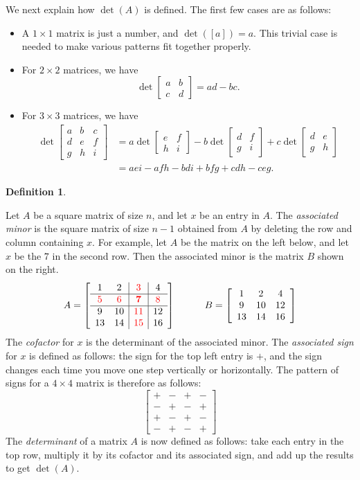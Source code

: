 \documentclass[a4paper]{book}
\newcommand{\RED}[1]{{\color{red}#1}}
\newcommand{\PURPLE}[1]{{\color{purple}#1}}
\newcommand{\bbm}       {\begin{bmatrix}}
\newcommand{\ebm}       {\end{bmatrix}}
\newcommand{\tm}        {\times}
\renewcommand{\:}{\colon}
\newcommand{\bilabel}[1]{\hypertarget{#1}{\label{#1}}}
\newcommand{\DEFN}[1]{\PURPLE{\emph{#1}}}
\theoremstyle{definition}
\newtheorem{definition}[theorem]{Definition}
\begin{document}
We next explain how $\det(A)$ is defined.  The first few cases are as
follows:
\begin{itemize}
 \item A $1\tm 1$ matrix is just a number, and $\det([a])=a$.  This
  trivial case is needed to make various patterns fit together
  properly. 
 \item For $2\tm 2$ matrices, we have 
  \[ \det\bbm a & b \\ c & d \ebm = ad-bc. \]
 \item For $3\tm 3$ matrices, we have
  \begin{align*}
   \det\bbm a&b&c \\ d&e&f \\ g&h&i \ebm &= 
    a\det\bbm e&f\\h&i \ebm -
    b\det\bbm d&f\\g&i \ebm +
    c\det\bbm d&e\\g&h \ebm \\
   &= aei-afh-bdi+bfg+cdh-ceg.
  \end{align*}
\end{itemize}
\begin{definition}\bilabel{defn-minor}
 Let $A$ be a square matrix of size $n$, and let $x$ be an entry in
 $A$.  The \DEFN{associated minor} is the square matrix of size $n-1$
 obtained from $A$ by deleting the row and column containing $x$.  For
 example, let $A$ be the matrix on the left below, and let $x$ be the
 $7$ in the second row.  Then the associated minor is the matrix $B$
 shown on the right.
 {\small \[  A=\left[\begin{array}{cc|c|c}
      1&2&\RED{3}&4\\
      \hline
      \RED{5}&\RED{6}&\RED{\mathbf{7}}&\RED{8}\\
      \hline
      9&10&\RED{11}&12\\
      13&14&\RED{15}&16
     \end{array}\right]
  \hspace{3em}
   B = \left[\begin{array}{ccc}
    1&2&4 \\ 9&10&12 \\ 13&14&16 
   \end{array}\right] 
 \]}
 The \DEFN{cofactor} for $x$ is the determinant of the associated
 minor.  The \DEFN{associated sign} for $x$ is defined as follows: the
 sign for the top left entry is $+$, and the sign changes each time
 you move one step vertically or horizontally.  The pattern of signs
 for a $4\tm 4$ matrix is therefore as follows:
 {\small \[ \bbm +&-&+&- \\ -&+&-&+ \\ +&-&+&- \\ -&+&-&+ \ebm \]}
 The \DEFN{determinant} of a matrix $A$ is now defined as follows:
 take each entry in the top row, multiply it by its cofactor and its
 associated sign, and add up the results to get $\det(A)$.
\end{definition}
\end{document}
